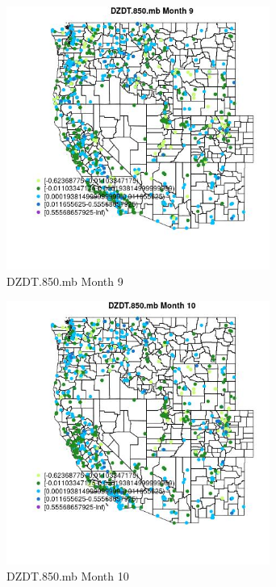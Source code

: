 \begin{figure} 
\centering  
\includegraphics[width=0.77\textwidth]{Code_Outputs/Report_ML_input_PM25_Step4_part_e_de_duplicated_aves_compiled_2019-05-21wNAs_MapObsMo9DZDT850mb.jpg} 
\caption{\label{fig:Report_ML_input_PM25_Step4_part_e_de_duplicated_aves_compiled_2019-05-21wNAsMapObsMo9DZDT850mb}DZDT.850.mb Month 9} 
\end{figure} 
 

\clearpage 

\begin{figure} 
\centering  
\includegraphics[width=0.77\textwidth]{Code_Outputs/Report_ML_input_PM25_Step4_part_e_de_duplicated_aves_compiled_2019-05-21wNAs_MapObsMo10DZDT850mb.jpg} 
\caption{\label{fig:Report_ML_input_PM25_Step4_part_e_de_duplicated_aves_compiled_2019-05-21wNAsMapObsMo10DZDT850mb}DZDT.850.mb Month 10} 
\end{figure} 
 

